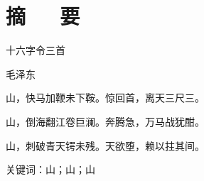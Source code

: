 
%
\chapter*{\heiti{}摘\ \ \  要} %
\begin{spacing}{1.66}
{\songti{}\selectfont

\begin{center}
十六字令三首

毛泽东

山，快马加鞭未下鞍。惊回首，离天三尺三。

山，倒海翻江卷巨澜。奔腾急，万马战犹酣。

山，刺破青天锷未残。天欲堕，赖以拄其间。
\end{center}
}
\end{spacing}

\heiti{}关键词：\songti{}山；山；山
\clearpage	
